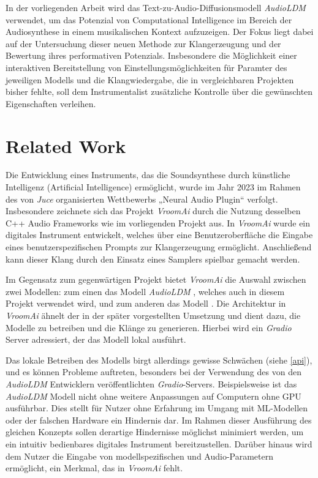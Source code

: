 \documentclass[
  a4paper,  %
  twoside,  %
  bibliography=totoc,
  headsepline,
  cleardoublepage=empty,
  parskip=half,
  draft=false
]{scrbook}
\begin{document}
In der vorliegenden Arbeit wird das Text-zu-Audio-Diffusionsmodell \emph{AudioLDM}\cite{liu_audioldm_2023} verwendet, um das Potenzial von Computational Intelligence im Bereich der Audiosynthese in einem musikalischen Kontext aufzuzeigen. Der Fokus liegt dabei auf der Untersuchung dieser neuen Methode zur Klangerzeugung und der Bewertung ihres performativen Potenzials. Insbesondere die Möglichkeit einer interaktiven Bereitstellung von Einstellungsmöglichkeiten für Paramter des jeweiligen Modells und die Klangwiedergabe, die in vergleichbaren Projekten bisher fehlte, soll dem Instrumentalist zusätzliche Kontrolle über die gewünschten Eigenschaften verleihen.


\chapter{Related Work}


Die Entwicklung eines Instruments, das die Soundsynthese durch künstliche Intelligenz (Artificial Intelligence) ermöglicht, wurde im Jahr 2023 im Rahmen des von \emph{Juce} \cite{noauthor_juce_nodate-1} organisierten Wettbewerbs „Neural Audio Plugin“ verfolgt. Insbesondere zeichnete sich das Projekt \emph{VroomAi} \cite{barney_hill_vroomai_2023} durch die Nutzung desselben C++ Audio Frameworks wie im vorliegenden Projekt aus. In \emph{VroomAi} wurde ein digitales Instrument entwickelt, welches über eine Benutzeroberfläche die Eingabe eines benutzerspezifischen Prompts zur Klangerzeugung ermöglicht. Anschließend kann dieser Klang durch den Einsatz eines Samplers spielbar gemacht werden.

Im Gegensatz zum gegenwärtigen Projekt bietet \emph{VroomAi} die Auswahl zwischen zwei Modellen: zum einen das Modell \emph{AudioLDM} \cite{liu_audioldm_2023}, welches auch in diesem Projekt verwendet wird, und zum anderen das Modell \cite{borsos_audiolm_2022}. Die Architektur in \emph{VroomAi} ähnelt der in der später vorgestellten Umsetzung und dient dazu, die Modelle zu betreiben und die Klänge zu generieren. Hierbei wird ein \emph{Gradio} Server \cite{team_gradio_gradio_nodate} adressiert, der das Modell lokal ausführt.

Das lokale Betreiben des Modells birgt allerdings gewisse Schwächen (siehe \ref{api}), und es können Probleme auftreten, besonders bei der Verwendung des von den \emph{AudioLDM} Entwicklern veröffentlichten \emph{Gradio}-Servers. Beispielsweise ist das \emph{AudioLDM} Modell nicht ohne weitere Anpassungen auf Computern ohne GPU ausführbar. Dies stellt für Nutzer ohne Erfahrung im Umgang mit ML-Modellen oder der falschen Hardware ein Hindernis dar. Im Rahmen dieser Ausführung des gleichen Konzepts sollen derartige Hindernisse möglichst minimiert werden, um ein intuitiv bedienbares digitales Instrument bereitzustellen. Darüber hinaus wird dem Nutzer die Eingabe von modellspezifischen und Audio-Parametern ermöglicht, ein Merkmal, das in \emph{VroomAi} fehlt.
\end{document}
